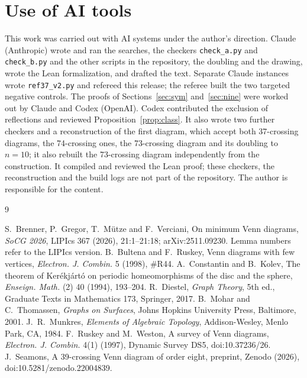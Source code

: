 \documentclass[11pt]{article}
\theoremstyle{remark}
\begin{document}
\section*{Use of AI tools}
This work was carried out with AI systems under the author's direction. Claude (Anthropic) wrote and ran the searches,
the checkers \texttt{check\_a.py} and \texttt{check\_b.py} and the other scripts in the repository, the doubling and
the drawing, wrote the Lean formalization, and drafted the text. Separate Claude instances wrote
\texttt{ref37\_v2.py} and refereed this release; the referee built the two targeted negative controls. The proofs of
Sections~\ref{sec:sym} and~\ref{sec:nine} were worked out by Claude and Codex (OpenAI). Codex contributed the
exclusion of reflections and reviewed Proposition~\ref{prop:class}. It also wrote two further checkers and a
reconstruction of the first diagram, which accept both 37-crossing diagrams, the 74-crossing ones, the 73-crossing
diagram and its doubling to $n=10$; it also rebuilt the 73-crossing diagram independently from the construction. It compiled
and reviewed the Lean proof; these checkers, the reconstruction and the build logs are not part of the repository.
The author is responsible for the content.

\small
\begin{thebibliography}{9}\setlength{\itemsep}{0pt}\raggedright
{} S.~Brenner, P.~Gregor, T.~M\"utze and F.~Verciani, On minimum Venn diagrams, \emph{SoCG 2026},
LIPIcs 367 (2026), 21:1--21:18; arXiv:2511.09230. Lemma numbers refer to the LIPIcs version.
 B.~Bultena and F.~Ruskey, Venn diagrams with few vertices, \emph{Electron. J. Combin.} 5 (1998),
\#R44.
 A.~Constantin and B.~Kolev, The theorem of Ker\'ekj\'art\'o on periodic homeomorphisms of the disc and
the sphere, \emph{Enseign. Math.} (2) 40 (1994), 193--204.
 R.~Diestel, \emph{Graph Theory}, 5th ed., Graduate Texts in Mathematics 173, Springer, 2017.
 B.~Mohar and C.~Thomassen, \emph{Graphs on Surfaces}, Johns Hopkins University Press, Baltimore, 2001.
 J.~R.~Munkres, \emph{Elements of Algebraic Topology}, Addison-Wesley, Menlo Park, CA, 1984.
 F.~Ruskey and M.~Weston, A survey of Venn diagrams, \emph{Electron. J. Combin.} 4(1) (1997), Dynamic
Survey DS5, doi:10.37236/26.
 J.~Seamons, A 39-crossing Venn diagram of order eight, preprint, Zenodo (2026),
doi:10.5281/zenodo.22004839.
\end{thebibliography}
\end{document}
